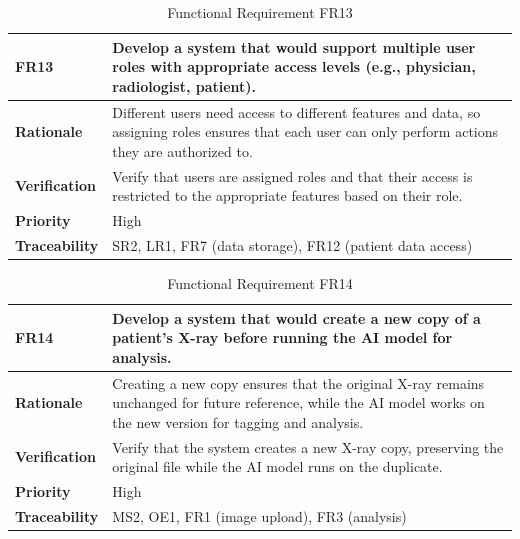 \documentclass[12pt]{article}
\begin{document}
\begin{table}[h!]
\centering
{}
\begin{tabular}{|p{3.5cm}|p{11.5cm}|}
\hline
\rowcolor{gray!30}
\textbf{FR13} & Develop a system that would support multiple user roles with appropriate access levels (e.g., physician, radiologist, patient). \\
\hline
\textbf{Rationale} & Different users need access to different features and data, so assigning roles ensures that each user can only perform actions they are authorized to. \\
\hline
\textbf{Verification} & Verify that users are assigned roles and that their access is restricted to the appropriate features based on their role. \\
\hline
\textbf{Priority} & High \\
\hline
\textbf{Traceability} &  SR2, LR1, FR7 (data storage), FR12 (patient data access) \\
\hline
\end{tabular}
\caption{Functional Requirement FR13}
\end{table}
\begin{table}[h!]
\centering
{}
\begin{tabular}{|p{3.5cm}|p{11.5cm}|}
\hline
\rowcolor{gray!30}
\textbf{FR14} & Develop a system that would create a new copy of a patient’s X-ray before running the AI model for analysis. \\
\hline
\textbf{Rationale} & Creating a new copy ensures that the original X-ray remains unchanged for future reference, while the AI model works on the new version for tagging and analysis. \\
\hline
\textbf{Verification} & Verify that the system creates a new X-ray copy, preserving the original file while the AI model runs on the duplicate. \\
\hline
\textbf{Priority} & High \\
\hline
\textbf{Traceability} & MS2, OE1, FR1 (image upload), FR3 (analysis) \\
\hline
\end{tabular}
\caption{Functional Requirement FR14}
\end{table}
\end{document}
